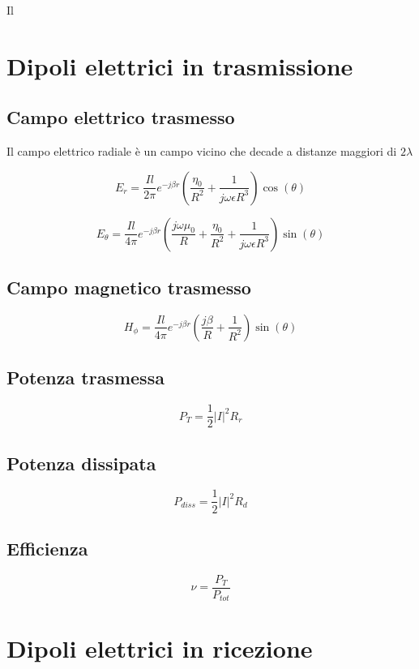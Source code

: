 \documentclass[10pt,a4paper]{report}
\begin{document}
	    Il
	 \section{Dipoli elettrici in trasmissione}

		\subsection{Campo elettrico trasmesso}

		Il campo elettrico radiale è un campo vicino che decade a distanze maggiori di $2\lambda$
		
		\begin{equation}
		E_r=\frac{I{l}}{2\pi}e^{-j\beta r}(\frac{ \eta_0}{R^2}+\frac{1}{j \omega \epsilon R^3})\cos(\theta)
		\end{equation}
		
		\[
		 E_{\theta} = \frac {Il} {4\pi} e^{-j\beta r} ( \frac {j\omega \mu_0} {R} + \frac {\eta_0} {R^2} + \frac {1}  {j \omega \epsilon R^3} ) \sin(\theta)
		\]

		\subsection{Campo magnetico trasmesso}

		\begin{equation}
		H_{\phi}=\frac{Il}{4\pi}e^{-j\beta r}(\frac{j \beta}{R}+\frac{1}{R^2})\sin(\theta)
		\end{equation}

		\subsection{Potenza trasmessa}

	  \[
	  P_T=\frac{1}{2}|I|^2R_r
	  \]

	  	\subsection{Potenza dissipata}

	  \[
	  P_{diss}=\frac{1}{2}|I|^2R_d
	  \]

	  \subsection{Efficienza}

	  	\[
		\nu=\frac{P_{T}}{P_{tot}}
	  	\]


		\section{Dipoli elettrici in ricezione}
\end{document}
